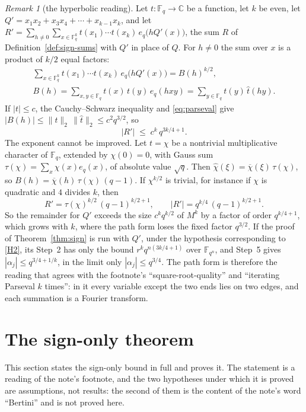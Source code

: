 \documentclass[11pt]{amsbook}
\theoremstyle{plain}
\theoremstyle{definition}
\theoremstyle{remark}
\newtheorem{remark}[theorem]{Remark}
\numberwithin{equation}{section}
\numberwithin{figure}{chapter}
\numberwithin{table}{chapter}
\renewcommand{\C}{\mathbb{C}}
\newcommand{\F}{\mathbb{F}}
\begin{document}
\begin{remark}[the hyperbolic reading]\label{rem:hyperbolic}
Let $t\colon\F_q\to\C$ be a function, let $k$ be even, let
$Q'=x_1x_2+x_3x_4+\cdots+x_{k-1}x_k$, and let
$R'=\sum_{h\ne0}\sum_{x\in\F_q^k}t(x_1)\cdots t(x_k)\,
e_q\bigl(hQ'(x)\bigr)$, the sum $R$ of
Definition~\ref{def:sign-sums} with $Q'$ in place of $Q$. For
$h\ne0$ the sum over $x$ is a product of $k/2$ equal factors:
\begin{gather*}
  \sum_{x\in\F_q^k} t(x_1)\cdots t(x_k)\,e_q\bigl(hQ'(x)\bigr)
  = B(h)^{k/2},\\
  B(h)=\sum_{x,y\in\F_q}t(x)\,t(y)\,e_q(hxy)
  =\sum_{y\in\F_q}t(y)\,\widehat t(hy).
\end{gather*}
If $|t|\le c$, the Cauchy--Schwarz inequality and
\eqref{eq:parseval} give
$|B(h)|\le\|t\|_2\,\|\widehat t\|_2\le c^2q^{3/2}$, so
\[
  |R'|\;\le\;c^k\,q^{3k/4+1}.
\]
The exponent cannot be improved. Let $t=\chi$ be a nontrivial
multiplicative character of $\F_q$, extended by $\chi(0)=0$, with
Gauss sum $\tau(\chi)=\sum_x\chi(x)e_q(x)$, of absolute value
$\sqrt q$. Then $\widehat\chi(\xi)=\overline\chi(\xi)\,\tau(\chi)$,
so $B(h)=\overline\chi(h)\,\tau(\chi)\,(q-1)$. If $\chi^{k/2}$ is
trivial, for instance if $\chi$ is quadratic and $4$ divides $k$,
then
\[
  R'=\tau(\chi)^{k/2}\,(q-1)^{k/2+1},\qquad
  |R'|=q^{k/4}\,(q-1)^{k/2+1}.
\]
So the remainder for $Q'$ exceeds the size $c^kq^{k/2}$ of $M^k$ by
a factor of order $q^{k/4+1}$, which grows with $k$, where the
path form loses the fixed factor $q^{3/2}$. If the proof of
Theorem~\ref{thm:sign} is run with $Q'$, under the hypothesis
corresponding to \ref{H2}, its Step~2 has only the bound
$r^kq^{n(3k/4+1)}$ over $\F_{q^n}$, and Step~5 gives
$|\alpha_j|\le q^{3/4+1/k}$, in the limit only
$|\alpha_j|\le q^{3/4}$. The path form is therefore
the reading that agrees with the footnote's ``square-root-quality''
and ``iterating Parseval $k$ times'': in it every variable except
the two ends lies on two edges, and each summation is a Fourier
transform.
\end{remark}

\section{The sign-only theorem}
\label{sec:sign}

This section states the sign-only bound in full and proves it. The
statement is a reading of the note's footnote, and the two
hypotheses under which it is proved are assumptions, not results:
the second of them is the content of the note's word ``Bertini''
and is not proved here.
\end{document}
